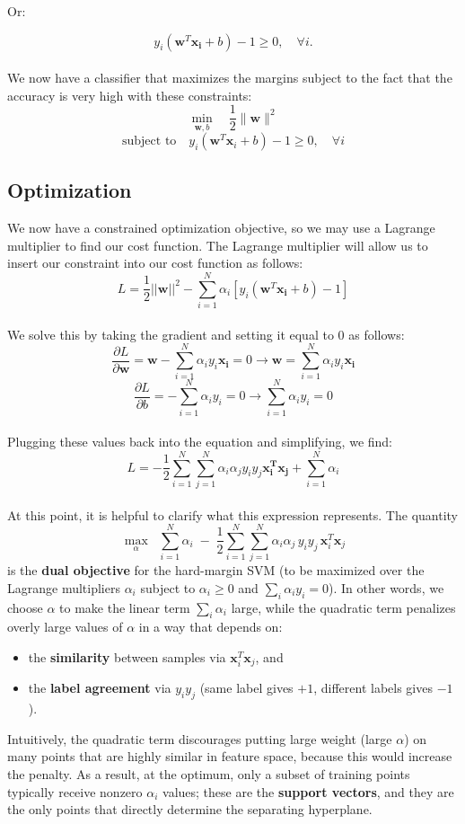 \documentclass{article}
\begin{document}
Or:

\[
y_i(\mathbf{w}^T \mathbf{x_i} + b) - 1 \geq 0,\quad \forall i.
\]\\
We now have a classifier that maximizes the margins subject to the fact that the accuracy is very high with these constraints:
\[
\min_{\mathbf{w}, b} \quad \frac{1}{2} \|\mathbf{w}\|^2
\]
\[
\text{subject to} \quad y_i (\mathbf{w}^T \mathbf{x}_i + b) - 1 \geq 0, \quad \forall i
\]
\subsection{Optimization}
\label{lagrange-optimization-subsection}
We now have a constrained optimization objective, so we may use a Lagrange multiplier to find our cost function. The Lagrange multiplier will allow us to insert our constraint into our cost function as follows:
\[
L = \frac{1}{2}||\mathbf{w}||^2 - \sum_{i=1}^{N} \alpha_i\left[ y_i(\mathbf{w}^T \mathbf{x_i} + b) - 1\right]
\]\\
We solve this by taking the gradient and setting it equal to 0 as follows:
\[
\frac{\partial L}{\partial \mathbf{w}} = \mathbf{w} - \sum_{i=1}^{N} \alpha_i y_i \mathbf{x_i} = 0 \rightarrow \mathbf{w} = \sum_{i=1}^{N} \alpha_i y_i \mathbf{x_i}
\]
\[
\frac{\partial L}{\partial b} = -\sum_{i=1}^{N} \alpha_i y_i = 0 \rightarrow \sum_{i=1}^{N} \alpha_i y_i = 0 
\]\\
Plugging these values back into the equation and simplifying, we find:
\[
L = -\frac{1}{2}\sum_{i=1}^{N} \sum_{j=1}^{N} \alpha_i \alpha_j y_i y_j \mathbf{x^T_i} \mathbf{x_j} + \sum_{i=1}^{N} \alpha_i
\]\\
At this point, it is helpful to clarify what this expression represents. The quantity
\[
\max_{\alpha}\;\; \sum_{i=1}^{N}\alpha_i \;-\;\frac{1}{2}\sum_{i=1}^{N}\sum_{j=1}^{N}\alpha_i\alpha_j\,y_i y_j\,\mathbf{x}_i^T\mathbf{x}_j
\]
is the \textbf{dual objective} for the hard-margin SVM (to be maximized over the Lagrange multipliers $\alpha_i$ subject to $\alpha_i\ge 0$ and $\sum_i \alpha_i y_i=0$). In other words, we choose $\alpha$ to make the linear term $\sum_i \alpha_i$ large, while the quadratic term penalizes overly large values of $\alpha$ in a way that depends on:
\begin{itemize}
    \item the \textbf{similarity} between samples via $\mathbf{x}_i^T\mathbf{x}_j$, and
    \item the \textbf{label agreement} via $y_i y_j$ (same label gives $+1$, different labels gives $-1$).
\end{itemize}
Intuitively, the quadratic term discourages putting large weight (large $\alpha$) on many points that are highly similar in feature space, because this would increase the penalty. As a result, at the optimum, only a subset of training points typically receive nonzero $\alpha_i$ values; these are the \textbf{support vectors}, and they are the only points that directly determine the separating hyperplane.
\end{document}
